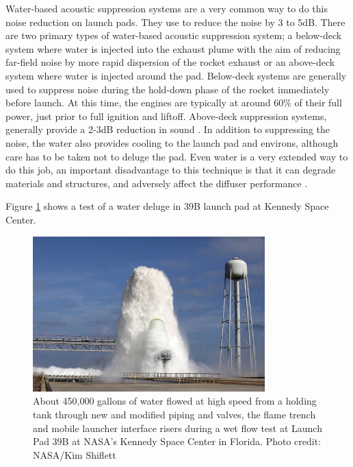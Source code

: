 Water-based acoustic suppression systems are a very common way to do this noise reduction
on launch pads. They use to reduce the noise by 3 to 5dB\cite{2016Pico}. There are two
primary types of water-based acoustic
suppression system; a below-deck system where water is injected into the exhaust plume with
the aim of reducing far-field noise by more rapid dispersion of the rocket exhaust \cite{2014Allgood} or an
above-deck system where water is injected around the pad. Below-deck systems are generally
used to suppress noise during the hold-down phase of the rocket immediately before launch. At
this time, the engines are typically at around 60\% of their full power, just prior to full ignition
and liftoff. Above-deck suppression systems, generally provide a 2-3dB
reduction in sound \cite{2015Houston}. In addition to suppressing the noise, the water also provides cooling to
the launch pad and environs, although care has to be taken not to deluge the pad.
Even water is a very extended way to do this job, an important disadvantage to
this technique is that it can degrade materials and structures\cite{2016Pico}, and
adversely affect the diffuser performance \cite{2014Allgood}.

Figure \ref{fig:deluge_39b_kennedy} shows a test of a water deluge in 39B launch
pad at Kennedy Space Center.

\begin{figure}[h]
	\centering
	\includegraphics[width=0.8\textwidth]{img/launch_pad_39b_water_deluge_test.jpg}
	\caption[Water deluge system test at Kennedy Space Center]
	{About 450,000 gallons of water flowed at high speed from a holding
	tank through new and modified piping and valves, the flame trench and
	mobile launcher interface risers during a wet flow test at Launch Pad
	39B at NASA's Kennedy Space Center in Florida. Photo credit: NASA/Kim Shiflett}
	\label{fig:deluge_39b_kennedy}
\end{figure}

